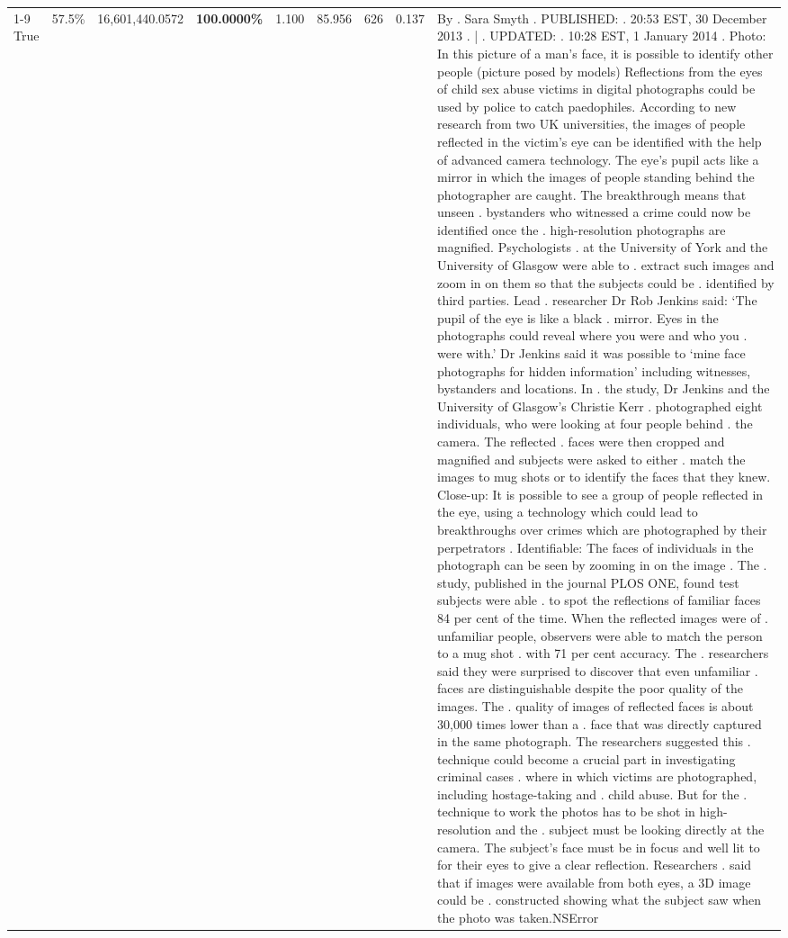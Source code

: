 \begin{table}[H]
\begin{tabular}{lllrlllll}
\cline{1-9} \cline{2-9}
True & 57.5\% & 16,601,440.0572 & \bfseries \color{red} 100.0000\% & 1.100 & 85.956 & 626 & 0.137 & By . Sara Smyth . PUBLISHED: . 20:53 EST, 30 December 2013 . | . UPDATED: . 10:28 EST, 1 January 2014 . Photo: In this picture of a man's face, it is possible to identify other people (picture posed by models) Reflections from the eyes of child sex abuse victims in digital photographs could be used by police to catch paedophiles. According to new research from two UK universities, the images of people reflected in the victim's eye can be identified with the help of advanced camera technology. The eye's pupil acts like a mirror in which the images of people standing behind the photographer are caught. The breakthrough means that unseen . bystanders who witnessed a crime could now be identified once the . high-resolution photographs are magnified. Psychologists . at the University of York and the University of Glasgow were able to . extract such images and zoom in on them so that the subjects could be . identified by third parties. Lead . researcher Dr Rob Jenkins said: ‘The pupil of the eye is like a black . mirror. Eyes in the photographs could reveal where you were and who you . were with.' Dr Jenkins said it was possible to ‘mine face photographs for hidden information' including witnesses, bystanders and locations. In . the study, Dr Jenkins and the University of Glasgow's Christie Kerr . photographed eight individuals, who were looking at four people behind . the camera. The reflected . faces were then cropped and magnified and subjects were asked to either . match the images to mug shots or to identify the faces that they knew. Close-up: It is possible to see a group of people reflected in the eye, using a technology which could lead to breakthroughs over crimes which are photographed by their perpetrators . Identifiable: The faces of individuals in the photograph can be seen by zooming in on the image . The . study, published in the journal PLOS ONE, found test subjects were able . to spot the reflections of familiar faces 84 per cent of the time. When the reflected images were of . unfamiliar people, observers were able to match the person to a mug shot . with 71 per cent accuracy. The . researchers said they were surprised to discover that even unfamiliar . faces are distinguishable despite the poor quality of the images. The . quality of images of reflected faces is about 30,000 times lower than a . face that was directly captured in the same photograph. The researchers suggested this . technique could become a crucial part in investigating criminal cases . where in which victims are photographed, including hostage-taking and . child abuse. But for the . technique to work the photos has to be shot in high-resolution and the . subject must be looking directly at the camera. The subject's face must be in focus and well lit to for their eyes to give a clear reflection. Researchers . said that if images were available from both eyes, a 3D image could be . constructed showing what the subject saw when the photo was taken.NSError \\

\end{tabular}
\end{table}
